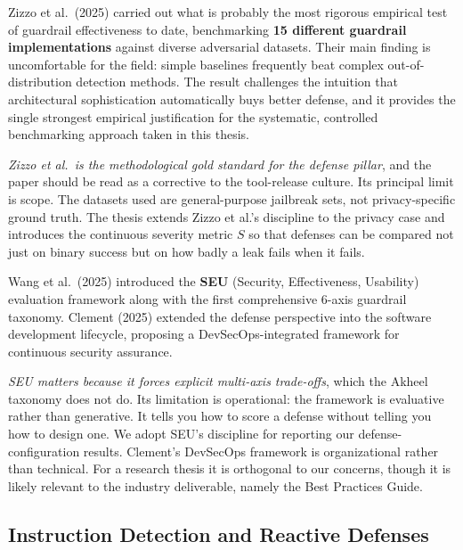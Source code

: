 \documentclass[12pt, a4paper]{article}
\begin{document}
Zizzo et al.\ (2025) carried out what is probably the most rigorous empirical test of guardrail effectiveness to date, benchmarking \textbf{15 different guardrail implementations} against diverse adversarial datasets. Their main finding is uncomfortable for the field: simple baselines frequently beat complex out-of-distribution detection methods. The result challenges the intuition that architectural sophistication automatically buys better defense, and it provides the single strongest empirical justification for the systematic, controlled benchmarking approach taken in this thesis.

\begin{critbox}
\textit{Zizzo et al.\ is the methodological gold standard for the defense pillar}, and the paper should be read as a corrective to the tool-release culture. Its principal limit is scope. The datasets used are general-purpose jailbreak sets, not privacy-specific ground truth. The thesis extends Zizzo et al.'s discipline to the privacy case and introduces the continuous severity metric $S$ so that defenses can be compared not just on binary success but on how badly a leak fails when it fails.
\end{critbox}

Wang et al.\ (2025) introduced the \textbf{SEU} (Security, Effectiveness, Usability) evaluation framework along with the first comprehensive 6-axis guardrail taxonomy. Clement (2025) extended the defense perspective into the software development lifecycle, proposing a DevSecOps-integrated framework for continuous security assurance.

\begin{critbox}
\textit{SEU matters because it forces explicit multi-axis trade-offs}, which the Akheel taxonomy does not do. Its limitation is operational: the framework is evaluative rather than generative. It tells you how to score a defense without telling you how to design one. We adopt SEU's discipline for reporting our defense-configuration results. Clement's DevSecOps framework is organizational rather than technical. For a research thesis it is orthogonal to our concerns, though it is likely relevant to the industry deliverable, namely the Best Practices Guide.
\end{critbox}

\subsection{Instruction Detection and Reactive Defenses}
\end{document}
